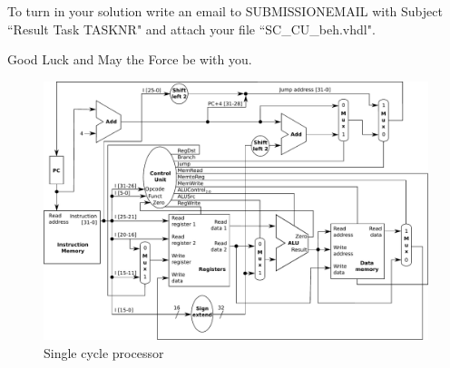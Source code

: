 \documentclass[a4paper,12pt]{article}
\begin{document}
To turn in your solution write an email to {{SUBMISSIONEMAIL}} with Subject ``Result Task {{TASKNR}}" and attach your file ``SC\_CU\_beh.vhdl".

\vspace{0.7cm}
Good Luck and May the Force be with you.

\begin{landscape}
\begin{figure}[!h]
\vspace{-0.5cm}
\hspace{-1.8cm}
\includegraphics[width=25.5cm]{../static/Single_Cycle_Processor_V_3_0}%
\caption{Single cycle processor}
\label{fig:SingleCycleProcessor}
\end{figure}
\end{landscape}
\end{document}
